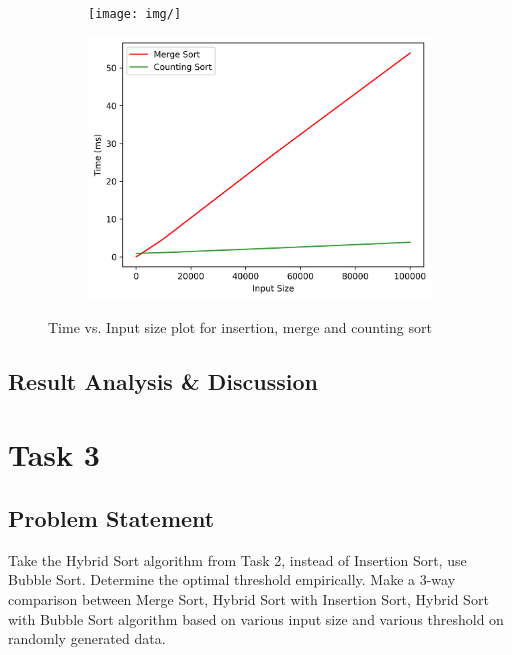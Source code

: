 \begin{figure}[H]
    \centering
    \begin{subfigure}[b]{0.4\textwidth}
        \centering
        \texttt{[image: img/]}
    \end{subfigure}
    \hfill
    \begin{subfigure}[b]{0.4\textwidth}
        \centering
        \includegraphics[width=\textwidth]{task1_merge_count.png}
    \end{subfigure}

    \caption{Time vs. Input size plot for insertion, merge and counting sort}
    \label{fig:task1plot}
\end{figure}

\subsection{Result Analysis \& Discussion}

\newpage
\section{Task 3}
\subsection{Problem Statement}
Take the Hybrid Sort algorithm from Task 2, instead of Insertion Sort, use
Bubble Sort. Determine the optimal threshold empirically. Make a 3-way
comparison between Merge Sort, Hybrid Sort with Insertion Sort, Hybrid Sort
with Bubble Sort algorithm based on various input size and various threshold on
randomly generated data.
